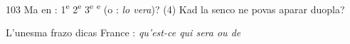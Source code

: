 \begin{VUpage}[107]{103}
Ma en : 1\textsuperscript{e}  2\textsuperscript{e} \nl
{} 3\textsuperscript{e} \textsuperscript{e}  (o : \textit{lo vera})? (4) Kad la senco ne povas\nl
aparar duopla?

L'unesma frazo dicas France : \textit{qu'est-ce qui sera ou de}\cc
\end{VUpage}

